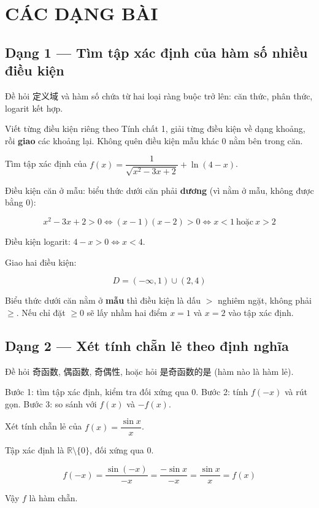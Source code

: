 \documentclass[11pt, a4paper]{article}
\begin{document}
\section{CÁC DẠNG BÀI}

\subsection{Dạng 1 — Tìm tập xác định của hàm số nhiều điều kiện}

 Đề hỏi 定义域 và hàm số chứa từ hai loại ràng buộc trở lên: căn thức, phân thức, logarit kết hợp.

 Viết từng điều kiện riêng theo Tính chất 1, giải từng điều kiện về dạng khoảng, rồi \textbf{giao} các khoảng lại. Không quên điều kiện mẫu khác $0$ nằm bên trong căn.

\begin{vidu}[{4}]
Tìm tập xác định của $f(x) = \dfrac{1}{\sqrt{x^2 - 3x + 2}} + \ln(4 - x)$.

Điều kiện căn ở mẫu: biểu thức dưới căn phải \textbf{dương} (vì nằm ở mẫu, không được bằng $0$):

$$x^2 - 3x + 2 > 0 \iff (x-1)(x-2) > 0 \iff x < 1 \ \text{hoặc} \ x > 2$$

Điều kiện logarit: $4 - x > 0 \iff x < 4$.

Giao hai điều kiện:

$$D = (-\infty, 1) \cup (2, 4)$$

 Biểu thức dưới căn nằm ở \textbf{mẫu} thì điều kiện là dấu $>$ nghiêm ngặt, không phải $\ge$. Nếu chỉ đặt $\ge 0$ sẽ lấy nhầm hai điểm $x = 1$ và $x = 2$ vào tập xác định.

\end{vidu}
\subsection{Dạng 2 — Xét tính chẵn lẻ theo định nghĩa}

 Đề hỏi 奇函数, 偶函数, 奇偶性, hoặc hỏi 是奇函数的是 (hàm nào là hàm lẻ).

 Bước 1: tìm tập xác định, kiểm tra đối xứng qua $0$. Bước 2: tính $f(-x)$ và rút gọn. Bước 3: so sánh với $f(x)$ và $-f(x)$.

\begin{vidu}[{5}]
Xét tính chẵn lẻ của $f(x) = \dfrac{\sin x}{x}$.

Tập xác định là $\mathbb{R} \setminus \{0\}$, đối xứng qua $0$.

$$f(-x) = \frac{\sin(-x)}{-x} = \frac{-\sin x}{-x} = \frac{\sin x}{x} = f(x)$$

Vậy $f$ là hàm chẵn.

\end{vidu}
\end{document}
